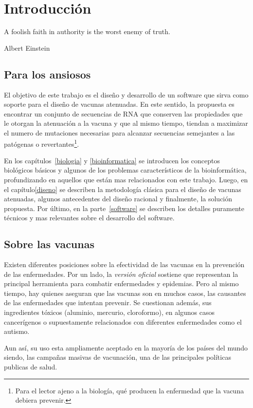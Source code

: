 \chapter{Introducci\'on}
\epigraph{A foolish faith in authority is the worst enemy of truth.}%
         {Albert Einstein}

\section{Para los ansiosos}
El objetivo de este trabajo es el dise\~no y desarrollo de un software que
sirva como soporte para el dise\~no de vacunas atenuadas. En este sentido, la
propuesta es encontrar un conjunto de secuencias de \ac{RNA} que conserven las
propiedades que le otorgan la atenuaci\'on a la vacuna y que al mismo tiempo,
tiendan a maximizar el numero de mutaciones necesarias para alcanzar secuencias
semejantes a las pat\'ogenas o revertantes\footnote{Para el lector ajeno a la
biolog\'ia, qu\'e producen la enfermedad que la vacuna debiera prevenir.}. 

En los cap\'itulos~\ref{biologia} y \ref{bioinformatica} se introducen los
conceptos biol\'ogicos b\'asicos y algunos de los problemas caracter\'isticos
de la bioinform\'atica, profundizando en aquellos que est\'an mas relacionados
con este trabajo. Luego, en el cap\'itulo\ref{diseno} se describen la
metodolog\'ia cl\'asica para el dise\~no de vacunas atenuadas, algunos
antecedentes del dise\~no racional y finalmente, la soluci\'on propuesta. Por
\'ultimo, en la parte~\ref{software} se describen los detalles puramente
t\'ecnicos y mas relevantes sobre el desarrollo del software.

\section{Sobre las vacunas}
\label{vacunas}
Existen diferentes posiciones sobre la efectividad de las vacunas en la
prevenci\'on de las enfermedades. Por un lado, la \textit{versi\'on oficial}
sostiene que representan la principal herramienta para combatir enfermedades y
epidemias. Pero al mismo tiempo, hay quienes aseguran que las vacunas son en
muchos casos, las causantes de las enfermedades que intentan prevenir. Se
cuestionan adem\'as, sus ingredientes t\'oxicos (aluminio, mercurio,
cloroformo), en algunos casos cancer\'igenos o supuestamente relacionados con
diferentes enfermedades como el autismo.

Aun as\'i, su uso esta ampliamente aceptado en la mayor\'ia de los pa\'ises del
mundo siendo, las campa\~nas masivas de vacunaci\'on, una de las principales
pol\'iticas publicas de salud. 

